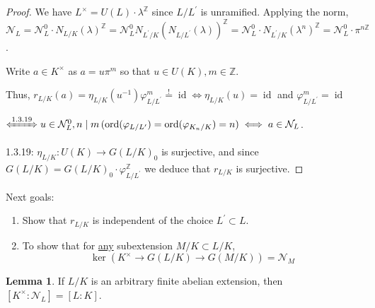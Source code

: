 \documentclass{article}
\theoremstyle{definition}
\numberwithin{theorem}{subsection}
\newtheorem{lemma}[theorem]{Lemma}
\begin{document}
    \begin{proof}
        We have \(L^\times = U(L) \cdot \lambda^\mathbb{Z}\) since \(L / L^{\prime}\) is unramified. Applying the norm, \(\mathcal{N}_L = \mathcal{N}_L^0 \cdot N_{L / K}(\lambda)^\mathbb{Z} = \mathcal{N}_L^0 N_{L^{\prime} / K}(N_{L / L^{\prime}}(\lambda))^\mathbb{Z} = \mathcal{N}_L^0 \cdot N_{L^{\prime} / K}(\lambda^n)^\mathbb{Z} = \mathcal{N}_L^0 \cdot \pi^{n \mathbb{Z}}\).
        
        Write \(a\in K^\times\) as \(a = u \pi^m\) so that \(u \in U(K), m\in \mathbb{Z}\).

        Thus, \(r_{L / K}(a) = \eta_{L / K}(u ^{-1})\varphi_{L / L^{\prime}}^m \overset{!}{=} \operatorname{id} \iff \eta_{L / K}(u) = \operatorname{id}\) and \(\varphi_{L / L^{\prime}}^m = \operatorname{id}\)
        
        \(\xLeftrightarrow{1.3.19} u \in \mathcal{N}_L^0, n \mid m\, (\operatorname{ord}(\varphi_{L / L^{\prime}})=\operatorname{ord}(\varphi_{K_n / K})=n) \iff a \in \mathcal{N}_L\).

        1.3.19: \(\eta_{L / K}: U(K) \to G(L / K)_0\) is surjective, and since \(G(L / K) = G(L / K)_0 \cdot \varphi_{L / L^{\prime}}^\mathbb{Z}\) we deduce that \(r_{L / K}\) is surjective.
    \end{proof}

    Next goals:

    \begin{enumerate}[label=\arabic*)]
        \item Show that \(r_{L / K}\) is independent of the choice \(L^{\prime} \subset L\).
        \item To show that for \underline{any} subextension \(M / K \subset L / K\),
        \[
            \ker (K^\times \to G(L / K) \to G(M / K)) = \mathcal{N}_M
        \]
    \end{enumerate} 

    \begin{lemma}
        If \(L / K\) is an arbitrary finite abelian extension, then \([K^\times : \mathcal{N}_L] = [L : K]\).
    \end{lemma}
\end{document}
